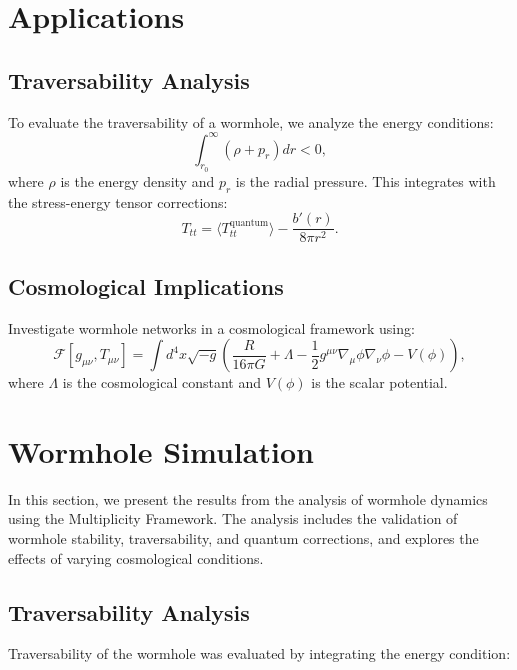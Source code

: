 \documentclass{article}
\theoremstyle{plain}
\begin{document}
\section{Applications}

\subsection{Traversability Analysis}
To evaluate the traversability of a wormhole, we analyze the energy conditions:
\begin{equation}
    \int_{r_0}^\infty \left(\rho + p_r\right) dr < 0,
\end{equation}
where $\rho$ is the energy density and $p_r$ is the radial pressure. This integrates with the stress-energy tensor corrections:
\begin{equation}
    T_{tt} = \langle T_{tt}^{\text{quantum}} \rangle - \frac{b'(r)}{8\pi r^2}.
\end{equation}

\subsection{Cosmological Implications}
Investigate wormhole networks in a cosmological framework using:
\begin{equation}
    \mathcal{F}[g_{\mu\nu}, T_{\mu\nu}] = \int d^4x \sqrt{-g} \left( \frac{R}{16\pi G} + \Lambda - \frac{1}{2}g^{\mu\nu}\nabla_\mu \phi \nabla_\nu \phi - V(\phi) \right),
\end{equation}
where $\Lambda$ is the cosmological constant and $V(\phi)$ is the scalar potential.

\section{Wormhole Simulation}

In this section, we present the results from the analysis of wormhole dynamics using the Multiplicity Framework. The analysis includes the validation of wormhole stability, traversability, and quantum corrections, and explores the effects of varying cosmological conditions.

\subsection{Traversability Analysis}

Traversability of the wormhole was evaluated by integrating the energy condition:
\end{document}
